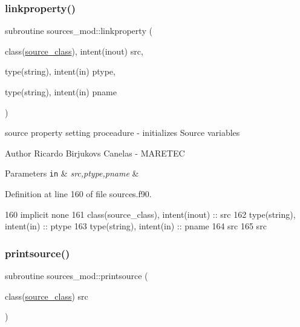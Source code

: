 \subsubsection{\texorpdfstring{linkproperty()}{linkproperty()}}
{\footnotesize\ttfamily subroutine sources\+\_\+mod\+::linkproperty (\begin{DoxyParamCaption}\item[{class(\mbox{\hyperlink{structsources__mod_1_1source__class}{source\+\_\+class}}), intent(inout)}]{src,  }\item[{type(string), intent(in)}]{ptype,  }\item[{type(string), intent(in)}]{pname }\end{DoxyParamCaption})\hspace{0.3cm}{\ttfamily [private]}}



source property setting proceadure -\/ initializes Source variables 

\begin{DoxyAuthor}{Author}
Ricardo Birjukovs Canelas -\/ M\+A\+R\+E\+T\+EC 
\end{DoxyAuthor}

\begin{DoxyParams}[1]{Parameters}
\mbox{\tt in}  & {\em src,ptype,pname} & \\
\hline
\end{DoxyParams}


Definition at line 160 of file sources.\+f90.


\begin{DoxyCode}
160     \textcolor{keywordtype}{implicit none}
161     \textcolor{keywordtype}{class}(source\_class), \textcolor{keywordtype}{intent(inout)} :: src
162     \textcolor{keywordtype}{type}(string), \textcolor{keywordtype}{intent(in)} :: ptype
163     \textcolor{keywordtype}{type}(string), \textcolor{keywordtype}{intent(in)} :: pname
164     src%
165     src%
\end{DoxyCode}
\mbox{\label{namespacesources__mod_a641fe9ecc295e486a714c1aaa133d991}} 
\subsubsection{\texorpdfstring{printsource()}{printsource()}}
{\footnotesize\ttfamily subroutine sources\+\_\+mod\+::printsource (\begin{DoxyParamCaption}\item[{class(\mbox{\hyperlink{structsources__mod_1_1source__class}{source\+\_\+class}})}]{src }\end{DoxyParamCaption})\hspace{0.3cm}{\ttfamily [private]}}



